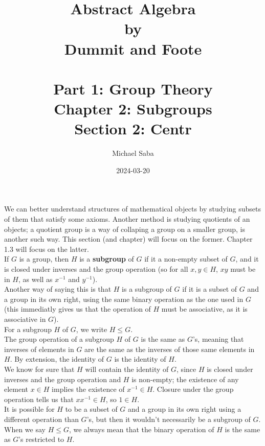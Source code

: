 \documentclass[12pt]{article}
\title{%
    \Huge Abstract Algebra \\
    \large by \\
    \Large Dummit and Foote \\~\\
    \huge Part 1: Group Theory \\
    \LARGE Chapter 2: Subgroups \\
    \Large Section 2: Centr
}
\date{2024-03-20}
\author{Michael Saba}
\begin{document}
    \maketitle
    \newpage
    \setlength{\parindent}{0pt}
    
    We can better understand structures of mathematical objects
    by studying subsets of them that satisfy some axioms.
    Another method is studying quotients of an objects;
    a quotient group is a way of collaping a group on a smaller group,
    is another such way.
    This section (and chapter) will focus on the former.
    Chapter 1.3 will focus on the latter. \\
    
    If $G$ is a group, then $H$ is a \textbf{subgroup} of $G$
    if it a non-empty subset of $G$, and it is closed under
    inverses and the group operation
    (so for all $x, y \in H$, $xy$ must be in $H$,
    as well as $x^{-1}$ and $y^{-1}$). \\
    Another way of saying this is that $H$ is a subgroup of $G$
    if it is a subset of $G$ and a group in its own right,
    using the same binary operation as the one used in $G$
    (this immediatly gives us that the operation of $H$
    must be associative, as it is associative in $G$). \\
    For a subgroup $H$ of $G$, we write $H \leqslant G$. \\

    The group operation of a subgroup $H$ of $G$ is the same as $G$'s,
    meaning that inverses of elements in $G$
    are the same as the inverses of those same elements in $H$.
    By extension, the identity of $G$ is the identity of $H$. \\
    We know for sure that $H$ will contain the identity of $G$,
    since $H$ is closed under inverses and the group operation
    and $H$ is non-empty;
    the existence of any element $x \in H$ implies
    the existence of $x^{-1} \in H$.
    Closure under the group operation tells us that $xx^{-1} \in H$,
    so $1 \in H$. \\

    It is possible for $H$ to be a subset of $G$
    and a group in its own right using a different operation than $G$'s,
    but then it wouldn't necessarily be a subgroup of $G$.
    When we say $H \leqslant G$,
    we always mean that the binary operation of $H$ is the same as $G$'s
    restricted to $H$. \\
\end{document}

